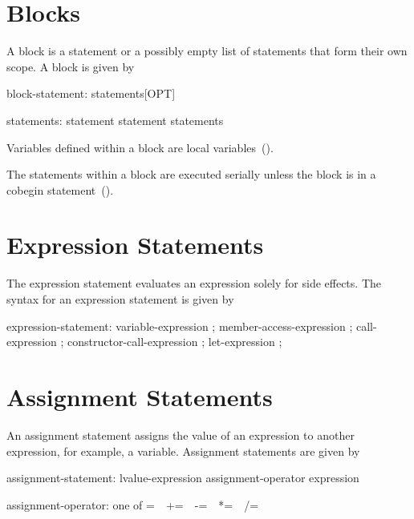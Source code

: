 \section{Blocks}
\label{Blocks}

A block is a statement or a possibly empty list of statements that
form their own scope.  A block is given by
\begin{syntax}
block-statement:
  { statements[OPT] }

statements:
  statement
  statement statements
\end{syntax}

Variables defined within a block are local
variables~().

The statements within a block are executed serially unless the block
is in a cobegin statement~().

\section{Expression Statements}
\label{Expression_Statements}
The expression statement evaluates an expression solely for side
effects. The syntax for an expression statement is given by
\begin{syntax}
expression-statement:
  variable-expression ;
  member-access-expression ;
  call-expression ;
  constructor-call-expression ;
  let-expression ; 
\end{syntax}

\section{Assignment Statements}
\label{Assignment_Statements}

An assignment statement assigns the value of an expression to another
expression, for
example, a variable.  Assignment statements are given by

\begin{syntax}
assignment-statement:
  lvalue-expression assignment-operator expression

assignment-operator: one of
   = $ $ $ $ += $ $ $ $ -= $ $ $ $ *= $ $ $ $ /= $ $ $ $ %
\end{syntax}

